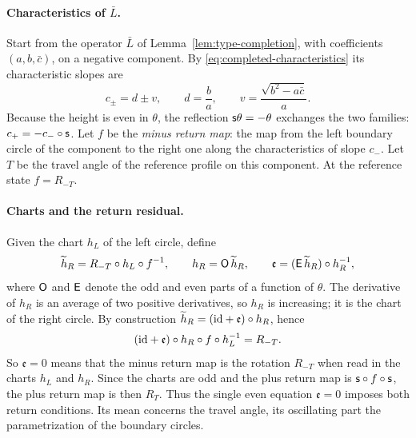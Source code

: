 \paragraph{Characteristics of $\bar L$.}
Start from the operator $\bar L$ of
Lemma~\ref{lem:type-completion}, with coefficients $(a,b,\bar c)$, on
a negative component. By \eqref{eq:completed-characteristics} its
characteristic slopes are
\[
 c_\pm=d\pm v,\qquad d=\frac ba,\qquad
 v=\frac{\sqrt{b^2-a\bar c}}{a}.
\]
Because the height is even in $\theta$, the reflection
$\mathsf s\theta=-\theta$ exchanges the two families:
$c_+=-c_-\circ\mathsf s$. Let $f$ be the \emph{minus return map}: the map
from the left boundary circle of the component to the right one along
the characteristics of slope $c_-$. Let $T$ be the travel angle of
the reference profile on this component. At the reference state
$f=R_{-T}$.

\paragraph{Charts and the return residual.}
Given the chart $h_L$ of the left circle, define
\begin{equation}\label{eq:full-height-one-chart}
 \widetilde h_R=R_{-T}\circ h_L\circ f^{-1},\qquad
 h_R=\mathsf O\,\widetilde h_R,\qquad
 \mathfrak e=(\mathsf E\,\widetilde h_R)\circ h_R^{-1},
\end{equation}
where $\mathsf O$ and $\mathsf E$ denote the odd and even parts of a function
of $\theta$. The derivative of $h_R$ is an average of two positive
derivatives, so $h_R$ is increasing; it is the chart of the right
circle. By construction
$\widetilde h_R=(\mathrm{id}+\mathfrak e)\circ h_R$, hence
\begin{equation}\label{eq:return-identity}
 (\mathrm{id}+\mathfrak e)\circ h_R\circ f\circ h_L^{-1}=R_{-T}.
\end{equation}
So $\mathfrak e=0$ means that the minus return map is the rotation
$R_{-T}$ when read in the charts $h_L$ and $h_R$. Since the charts
are odd and the plus return map is $\mathsf s\circ f\circ\mathsf s$, the plus
return map is then $R_{T}$. Thus the single even equation $\mathfrak e=0$
imposes both return conditions. Its mean concerns the travel angle,
its oscillating part the parametrization of the boundary circles.

